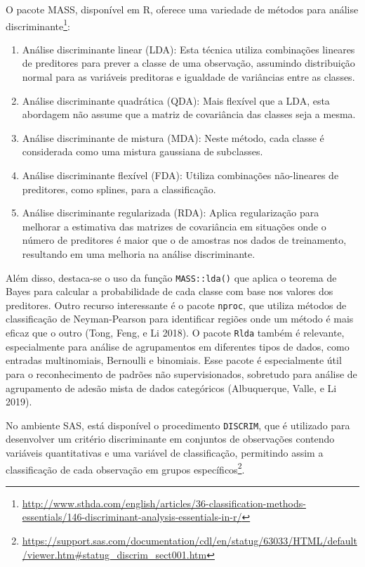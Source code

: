 \documentclass[
  a4paperpaper,
]{article}
\begin{document}
O pacote MASS, disponível em R, oferece uma variedade de métodos para
análise discriminante\footnote{\url{http://www.sthda.com/english/articles/36-classification-methods-essentials/146-discriminant-analysis-essentials-in-r/}}:

\begin{enumerate}
\def\labelenumi{\arabic{enumi}.}
\item
  Análise discriminante linear (LDA): Esta técnica utiliza combinações
  lineares de preditores para prever a classe de uma observação,
  assumindo distribuição normal para as variáveis preditoras e igualdade
  de variâncias entre as classes.
\item
  Análise discriminante quadrática (QDA): Mais flexível que a LDA, esta
  abordagem não assume que a matriz de covariância das classes seja a
  mesma.
\item
  Análise discriminante de mistura (MDA): Neste método, cada classe é
  considerada como uma mistura gaussiana de subclasses.
\item
  Análise discriminante flexível (FDA): Utiliza combinações não-lineares
  de preditores, como splines, para a classificação.
\item
  Análise discriminante regularizada (RDA): Aplica regularização para
  melhorar a estimativa das matrizes de covariância em situações onde o
  número de preditores é maior que o de amostras nos dados de
  treinamento, resultando em uma melhoria na análise discriminante.
\end{enumerate}

Além disso, destaca-se o uso da função \texttt{MASS::lda()} que aplica o
teorema de Bayes para calcular a probabilidade de cada classe com base
nos valores dos preditores. Outro recurso interessante é o pacote
\texttt{nproc}, que utiliza métodos de classificação de Neyman-Pearson
para identificar regiões onde um método é mais eficaz que o outro (Tong,
Feng, e Li 2018). O pacote \texttt{Rlda} também é relevante,
especialmente para análise de agrupamentos em diferentes tipos de dados,
como entradas multinomiais, Bernoulli e binomiais. Esse pacote é
especialmente útil para o reconhecimento de padrões não supervisionados,
sobretudo para análise de agrupamento de adesão mista de dados
categóricos (Albuquerque, Valle, e Li 2019).

No ambiente SAS, está disponível o procedimento \texttt{DISCRIM}, que é
utilizado para desenvolver um critério discriminante em conjuntos de
observações contendo variáveis quantitativas e uma variável de
classificação, permitindo assim a classificação de cada observação em
grupos específicos\footnote{\url{https://support.sas.com/documentation/cdl/en/statug/63033/HTML/default/viewer.htm\#statug_discrim_sect001.htm}}.
\end{document}

